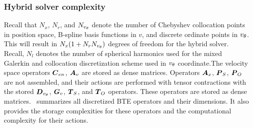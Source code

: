 \subsubsection{Hybrid solver complexity}
Recall that $N_x$, $N_r$, and $N_{{v_{\theta}}}$ denote the number of Chebyshev collocation points in position space, B-spline basis functions in $v$, and discrete ordinate points in ${v_{\theta}}$. This will result in $N_x(1 + N_r N_{{v_{\theta}}})$ degrees of freedom for the hybrid solver. Recall, $N_l$ denotes the number of spherical harmonics used for the mixed Galerkin and collocation discretization scheme used in ${v_{\theta}}$ coordinate.The velocity space operators $\boldsymbol{C}_{en}$, $\boldsymbol{A}_v$ are stored as dense matrices. Operators $\boldsymbol{A}_x$, $\boldsymbol{P}_S$, $\boldsymbol{P}_O$ are not assembled, and their actions are performed with tensor contractions with the stored $\boldsymbol{D}_{v_{\theta}}$, $\boldsymbol{G}_v$, $\boldsymbol{T}_S$, and $\boldsymbol{T}_O$ operators. These operators are stored as dense matrices. ~summarizes all discretized BTE operators and their dimensions. It also provides the storage complexities for these operators and the computational complexity for their actions.
